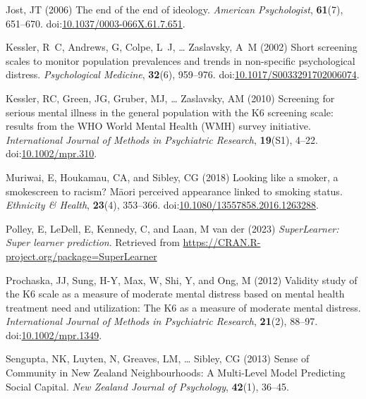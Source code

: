 \documentclass[
  singlecolumn,
  9pt]{article}
\newlength{\cslhangindent}
\newlength{\cslentryspacingunit} %
\newenvironment{CSLReferences}[2] %
 {%
  \setlength{\parindent}{0pt}
  \ifodd #1
  \let\oldpar\par
  \def\par{\hangindent=\cslhangindent\oldpar}
  \fi
  \setlength{\parskip}{#2\cslentryspacingunit}
 }%
 {}
\begin{document}
\begin{CSLReferences}{1}{0}
\leavevmode{}%
Jost, JT (2006) The end of the end of ideology. \emph{American
Psychologist}, \textbf{61}(7), 651--670.
doi:\href{https://doi.org/10.1037/0003-066X.61.7.651}{10.1037/0003-066X.61.7.651}.

\leavevmode{}%
Kessler, R~C, Andrews, G, Colpe, L~J, \ldots{} Zaslavsky, A~M (2002)
Short screening scales to monitor population prevalences and trends in
non-specific psychological distress. \emph{Psychological Medicine},
\textbf{32}(6), 959--976.
doi:\href{https://doi.org/10.1017/S0033291702006074}{10.1017/S0033291702006074}.

\leavevmode{}%
Kessler, RC, Green, JG, Gruber, MJ, \ldots{} Zaslavsky, AM (2010)
Screening for serious mental illness in the general population with the
K6 screening scale: results from the WHO World Mental Health (WMH)
survey initiative. \emph{International Journal of Methods in Psychiatric
Research}, \textbf{19}(S1), 4--22.
doi:\href{https://doi.org/10.1002/mpr.310}{10.1002/mpr.310}.

\leavevmode{}%
Muriwai, E, Houkamau, CA, and Sibley, CG (2018) Looking like a smoker, a
smokescreen to racism? Māori perceived appearance linked to smoking
status. \emph{Ethnicity \& Health}, \textbf{23}(4), 353--366.
doi:\href{https://doi.org/10.1080/13557858.2016.1263288}{10.1080/13557858.2016.1263288}.

\leavevmode{}%
Polley, E, LeDell, E, Kennedy, C, and Laan, M van der (2023)
\emph{SuperLearner: Super learner prediction}. Retrieved from
\url{https://CRAN.R-project.org/package=SuperLearner}

\leavevmode{}%
Prochaska, JJ, Sung, H-Y, Max, W, Shi, Y, and Ong, M (2012) Validity
study of the K6 scale as a measure of moderate mental distress based on
mental health treatment need and utilization: The K6 as a measure of
moderate mental distress. \emph{International Journal of Methods in
Psychiatric Research}, \textbf{21}(2), 88--97.
doi:\href{https://doi.org/10.1002/mpr.1349}{10.1002/mpr.1349}.

\leavevmode{}%
Sengupta, NK, Luyten, N, Greaves, LM, \ldots{} Sibley, CG (2013) Sense
of Community in New Zealand Neighbourhoods: A Multi-Level Model
Predicting Social Capital. \emph{New Zealand Journal of Psychology},
\textbf{42}(1), 36--45.


\end{CSLReferences}
\end{document}
